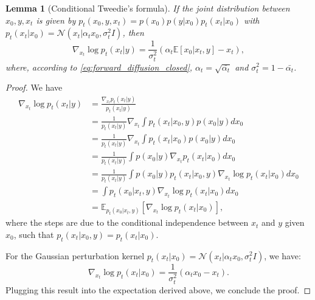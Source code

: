 \documentclass[10pt,a4paper]{amsart}
\newtheorem{lemma}{Lemma}
\begin{document}
	\begin{lemma}[Conditional Tweedie's formula]
		If the joint distribution between $x_0, y, x_t$ is given by $p_t(x_0, y, x_t) = p(x_0)p(y|x_0)p_t(x_t|x_0)$ with $p_t(x_t|x_0) = \mathcal{N}(x_t| \alpha_t x_0,  \sigma_t^2 I)$, then 
		\begin{equation}
			\nabla_{x_t} \log p_t(x_t|y) = \frac{1}{ \sigma_t^2}(\alpha_t \mathbb{E}[x_0|x_t, y] - x_t),
		\end{equation}
		where, according to \eqref{eq:forward_diffusion_closed},	$\alpha_t = \sqrt{\bar{\alpha_t}}$ and
		$\sigma_t^2 = 1-{\bar{\alpha_t}}$.
	\end{lemma}

	\begin{proof}
    We have
		\begin{align}
			\nabla_{x_t} \log p_t(x_t|y) &= \frac{\nabla_{x_t} p_t(x_t|y)}{p_t(x_t|y)} \\
			&= \frac{1}{p_t(x_t|y)} \nabla_{x_t} \int p_t(x_t|x_0, y) p(x_0|y) dx_0 \\
			&= \frac{1}{p_t(x_t|y)} \nabla_{x_t} \int p_t(x_t|x_0) p(x_0|y) dx_0 \\
			&= \frac{1}{p_t(x_t|y)} \int p(x_0|y) \nabla_{x_t} p_t(x_t|x_0) dx_0 \\
			&= \frac{1}{p_t(x_t|y)} \int p(x_0|y) p_t(x_t|x_0, y) \nabla_{x_t} \log p_t(x_t|x_0) dx_0 \\
			&= \int p_t(x_0|x_t, y) \nabla_{x_t} \log p_t(x_t|x_0) dx_0 \\
			&= \mathbb{E}_{p_t(x_0|x_t, y)}[\nabla_{x_t} \log p_t(x_t|x_0)],
		\end{align}
		where the steps  are due to the conditional independence between $x_t$ and $y$ given $x_0$, such that $p_t(x_t|x_0, y) = p_t(x_t|x_0)$. 
		
		For the Gaussian perturbation kernel $p_t(x_t|x_0) = \mathcal{N}(x_t|\alpha_t x_0, \sigma_t^2 I)$, we have:
		\begin{equation}
			\nabla_{x_t} \log p_t(x_t|x_0) = \frac{1}{ \sigma_t^2}(\alpha_t x_0 - x_t).
		\end{equation}
		Plugging this result into the expectation derived above, we conclude the proof.
	\end{proof}		
\end{document}
